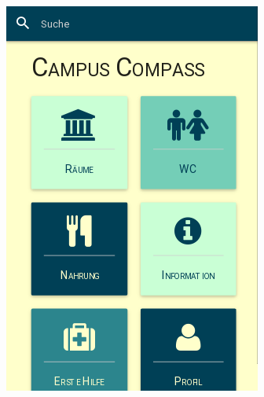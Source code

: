 \begin{figure}[ht]
\begin{minipage}[b]{.5\textwidth}
  \label{img:menu-mockup}
\end{minipage}%
\begin{minipage}[b]{.5\textwidth}
  \centering
  \includegraphics[width=.8\linewidth]{img/menu.png}
  \label{img:menu-first-draft}
\end{minipage}
\end{figure}

